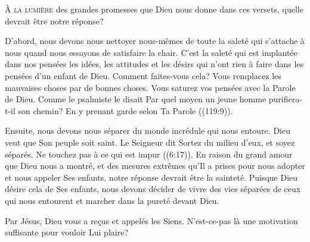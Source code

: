 


\lettrine{À}{ la lumière} des grandes promesses que Dieu nous donne
 dans ces versets, quelle devrait être notre réponse? 

D'abord, nous devons nous nettoyer nous-mêmes de toute la saleté
 qui s'attache à nous quand nous essayons de satisfaire la chair.
 C'est la saleté qui est implantée dans nos pensées
 \ocadr les idées, les attitudes et les désirs qui n'ont rien à faire
 dans les pensées d'un enfant de Dieu. Comment faites-vous cela?
 Vous remplacez les mauvaises choses par de bonnes choses.
 Vous saturez vos pensées avec la Parole de Dieu.
 Comme le psalmiste le disait\frcolon{} 
 \Og Par quel moyen un jeune homme purifiera-t-il son chemin?
 En y prenant garde selon Ta Parole \Fg{} ((119:9)).


Ensuite, nous devons nous séparer du monde incrédule qui nous entoure.
 Dieu veut que Son peuple soit saint. Le Seigneur dit\frcolon{} 
 \Og Sortez du milieu d’eux, et soyez séparés.
 Ne touchez pas à ce qui est impur \Fg{} ((6:17)).
 En raison du grand amour que Dieu nous a montré,
 et des mesures extrêmes qu'Il a prises pour nous adopter
 et nous appeler Ses enfants, notre réponse devrait être la sainteté.
 Puisque Dieu désire cela de Ses enfants, nous devons décider de vivre
 des vies séparées de ceux qui nous entourent et marcher dans la pureté
 devant Dieu.

Par Jésus, Dieu vous a re\c{c}us et appelés les Siens.
 N'est-ce-pas là une motivation suffisante pour vouloir Lui plaire?

\dvrule




